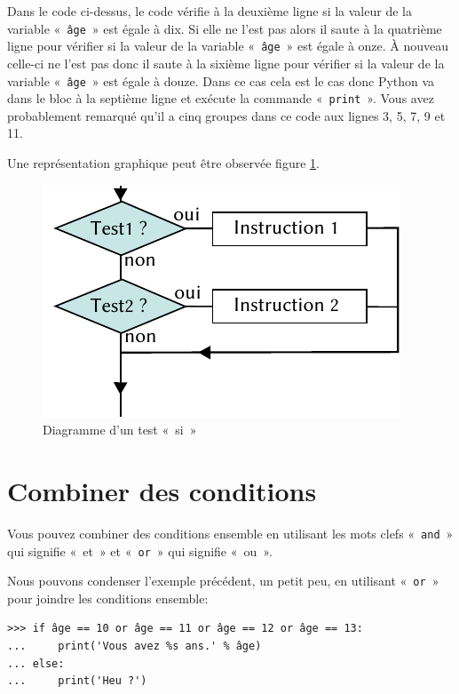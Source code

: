 Dans le code ci-dessus, le code vérifie à la deuxième ligne si la valeur de la variable «~\texttt{âge}~» est égale à dix.
Si elle ne l'est pas alors il saute à la quatrième ligne pour vérifier si 
la valeur de la variable «~\texttt{âge}~» est égale à onze. À nouveau  celle-ci     ne l'est pas donc il saute à la sixième ligne  pour vérifier si 
la valeur de la variable «~\texttt{âge}~» est égale à douze. Dans ce cas cela est le cas donc Python va dans le bloc à la septième ligne et exécute la commande «~\texttt{print}~».
Vous avez probablement remarqué qu'il a cinq groupes dans ce code aux lignes 3, 5, 7, 9 et 11.

Une représentation graphique peut être observée figure \ref{fig:Cf-elif-fr}.

\begin{figure}[ht]
\centering
\includegraphics[scale=1.5]{images/Cf-elif-fr.pdf}
\caption{Diagramme d'un test «~si~»}
\label{fig:Cf-elif-fr}
\end{figure}

\section{Combiner des conditions}
Vous pouvez combiner des conditions ensemble en utilisant les mots clefs «~\texttt{and}~» qui signifie «~et~» et «~\texttt{or}~» qui signifie «~ou~».

Nous pouvons condenser l'exemple précédent, un petit peu, en utilisant «~\texttt{or}~» pour joindre les conditions ensemble:

\begin{Verbatim}[frame=single,rulecolor=\color{green}, label=à taper avec attention]
>>> if âge == 10 or âge == 11 or âge == 12 or âge == 13:
...     print('Vous avez %s ans.' % âge)
... else:
...     print('Heu ?')
\end{Verbatim}

